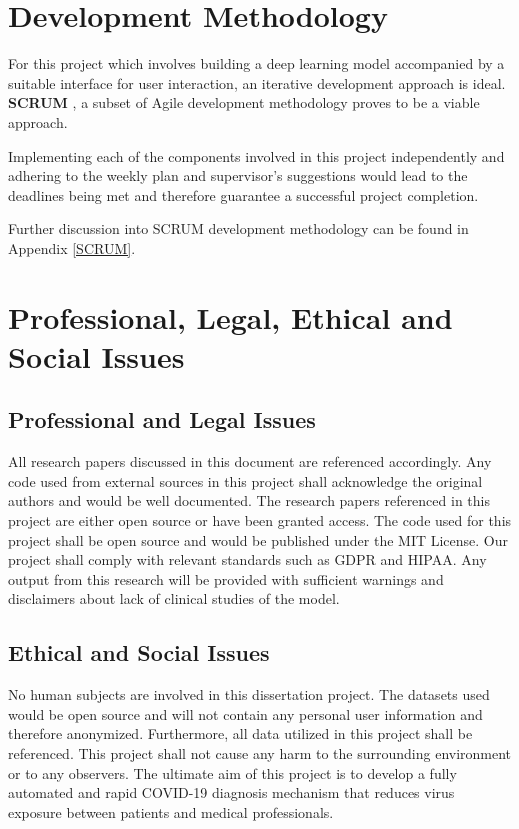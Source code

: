 \section{Development Methodology}

For this project which involves building a deep learning model 
accompanied by a suitable interface for user interaction, 
an iterative development approach is ideal. \textbf{SCRUM} \cite{SCR}, 
a subset of Agile development methodology proves to be a viable approach. 

Implementing each of the components involved in this project independently 
and adhering to the weekly plan and supervisor's suggestions 
would lead to the deadlines being met and therefore guarantee a successful project completion. 

Further discussion into SCRUM development methodology can be found in Appendix \ref{SCRUM}.

\section{Professional, Legal, Ethical and Social Issues}
\subsection{Professional and Legal Issues}
All research papers discussed in this document are referenced 
accordingly. Any code used from external sources in this project 
shall acknowledge the original authors and would be well documented.
The research papers referenced in this project are either open source 
or have been granted access. The code used for this project shall be 
open source and would be published under the MIT License. Our project shall comply 
with relevant standards such as GDPR and HIPAA. Any output from this research will be provided with sufficient warnings and disclaimers about lack of clinical studies of the model.

\subsection{Ethical and Social Issues}
No human subjects are involved in this dissertation project. The 
datasets used would be open source and will not 
contain any personal user information and therefore anonymized. Furthermore, all data utilized in this 
project shall be referenced. This project shall not cause any harm to the 
surrounding environment or to any observers. The ultimate aim of this project is to develop a fully automated and rapid COVID-19 diagnosis 
mechanism that reduces virus exposure between patients and 
medical professionals.